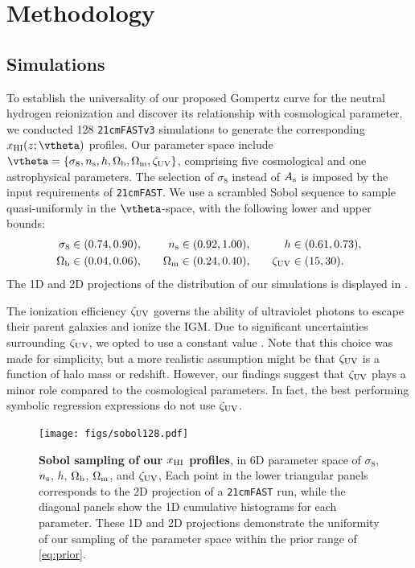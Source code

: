 \section*{Methodology}
\label{sec:methods}




\subsection*{Simulations}
\label{ssec:sims}

To establish the universality of our proposed Gompertz curve for the
neutral hydrogen reionization and discover its relationship with
cosmological parameter, we conducted 128 \texttt{21cmFASTv3}
simulations to generate the corresponding $x_\HI(z; \vtheta)$ profiles.
Our parameter space include $\vtheta = \{\sigma_8, \ns, h, \Omegab,
\Omegam, \zetaUV\}$, comprising five cosmological and one astrophysical
parameters.
The selection of $\sigma_8$ instead of $A_\mathrm{s}$ is imposed by the input
requirements of \texttt{21cmFAST}.
We use a scrambled Sobol sequence \cite{Sobol1967, Owen1998} to sample
quasi-uniformly in the $\vtheta$-space, with the following lower and
upper bounds:
%
\begin{alignat}{3}
\label{eq:prior}
\sigma_8 &\in (0.74, 0.90), &\quad
n_\mathrm{s} &\in (0.92, 1.00), &\quad
h &\in (0.61, 0.73), \nonumber\\
\Omega_\mathrm{b} &\in (0.04, 0.06), &\quad
\Omega_\mathrm{m} &\in (0.24, 0.40), &\quad
\zeta_\mathrm{UV} &\in (15, 30).
\end{alignat}
%
The 1D and 2D projections of the distribution of our simulations is
displayed in .

The ionization efficiency $\zeta_\mathrm{UV}$ governs the ability of ultraviolet
photons to escape their parent galaxies and ionize the IGM.
Due to significant uncertainties surrounding $\zeta_\mathrm{UV}$, we opted to use
a constant value .
Note that this choice was made for simplicity, but a more realistic
assumption might be that $\zeta_\mathrm{UV}$ is a function of halo mass
\cite{Park2019} or redshift.
However, our findings suggest that $\zeta_\mathrm{UV}$ plays a minor role compared
to the cosmological parameters.
In fact, the best performing symbolic regression expressions do not use
$\zeta_\mathrm{UV}$.

\begin{figure}[tb]
\centering
\texttt{[image: figs/sobol128.pdf]}
\caption{\textbf{Sobol sampling of our $x_{\mathrm{HI}}$ profiles}, in 6D
parameter space of $\sigma_8$, $n_\mathrm{s}$, $h$, $\Omega_\mathrm{b}$, $\Omega_\mathrm{m}$, and
$\zeta_\mathrm{UV}$,
Each point in the lower triangular panels corresponds to the 2D
projection of a \texttt{21cmFAST} run, while the diagonal panels show
the 1D cumulative histograms for each parameter.
These 1D and 2D projections demonstrate the uniformity of our sampling
of the parameter space within the prior range of \cref{eq:prior}.}
\label{fig:sobol}
\end{figure}

